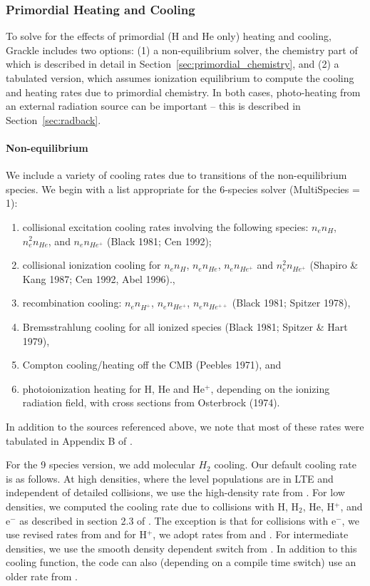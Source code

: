 \subsubsection{Primordial Heating and Cooling}

To solve for the effects of primordial (H and He only) heating and cooling, Grackle includes two options: (1) a non-equilibrium solver, the chemistry part of which is described in detail in Section~\ref{sec:primordial_chemistry}, and (2) a tabulated version, which assumes ionization equilibrium to compute the cooling and heating rates due to primordial chemistry.  In both cases, photo-heating from an external radiation source can be important -- this is described in Section~\ref{sec:radback}.

\paragraph{Non-equilibrium} \label{sec:pri-neq}

We include a variety of cooling rates due to transitions of the non-equilibrium species.  We begin with a list appropriate for the 6-species solver (MultiSpecies = 1): 

\begin{enumerate}
\item collisional excitation cooling rates involving the following species: $n_e n_H$, $n_e^2 n_{He}$, and $n_e n_{He^+}$ (Black 1981; Cen 1992); 
\item collisional ionization cooling for $n_e n_H$, $n_e n_{He}$, $n_e n_{He^+}$ and $n_e^2 n_{He^+}$ (Shapiro \& Kang 1987; Cen 1992, Abel 1996)., 
\item recombination cooling: $n_e n_{H^+}$, $n_e n_{He^+}$, $n_e n_{He^{++}}$ (Black 1981; Spitzer 1978),
\item Bremsstrahlung cooling for all ionized species (Black 1981; Spitzer \& Hart 1979), 
\item Compton cooling/heating off the CMB (Peebles 1971), and 
\item photoionization heating for H, He and He$^+$, depending on the ionizing radiation field, with cross sections from Osterbrock (1974).   
\end{enumerate}
In addition to the sources referenced above, we note that most of these rates were tabulated in Appendix B of \citet{1997NewA....2..209A}.

For the 9 species version, we add molecular $H_2$ cooling.  Our default cooling rate is as follows.  At high densities, where the level populations are in LTE and independent of detailed collisions, we use the high-density rate from \citet{1998A&A...335..403G}. For low densities, we computed the cooling rate due to collisions with H, H$_2$, He, H$^+$, and e$^-$ as described in section 2.3 of  \citet{2008MNRAS.388.1627G}.  The exception is that for collisions with e$^-$, we use revised rates from \citet{yoon2008cross} and for H$^+$, we adopt rates from \citet{2011PhRvL.107b3201H} and \citet{2012PhRvL.108j9903H}.  For intermediate densities, we use the smooth density dependent switch from \citet{1998A&A...335..403G}.  In addition to this cooling function, the code can also (depending on a compile time switch) use an older rate from \citet{1984ApJ...280..465L}.

